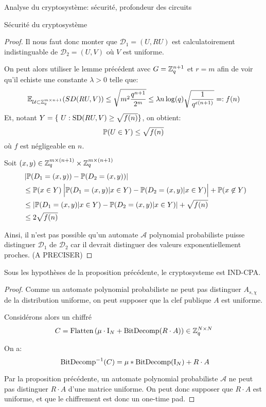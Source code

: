 \begin{section}{Analyse du cryptosystème: sécurité, profondeur des circuits}
\begin{subsection}{Sécurité du cryptosystème}
\begin{proof}
	Il nous faut donc monter que $\mathcal{D}_1 = (U, RU)$ est calculatoirement
	indistinguable de $\mathcal{D}_2 = (U, V)$ où $V$ est uniforme.
	
	On peut alors utiliser le lemme précédent avec $G = \mathbb{Z}_q^{n+1}$
	et $r = m$ afin de voir qu'il echiste une constante $\lambda > 0$
	telle que:
	\[\mathbb{E}_{\mathcal{U}\subset \mathbb{Z}_q^{m\times n+1}}(SD(RU,V)) \leq 
		\sqrt{m^2\frac{q^{n+1}}{2^m}}\leq \lambda
	n\log(q)\sqrt{\frac{1}{q^{\epsilon(n+1)}}}=: f(n) \]
	Et, notant $Y = \{ U: \SD(RU,V) \geq \sqrt{f(n)}\}$, on obtient:
	\[\mathbb{P}(U \in Y) \leq \sqrt{f(n)} \]
	où $f$ est négligeable en $n$. 



	
	Soit $(x,y)\in \mathbb{Z}_q^{m \times (n+1)} \times \mathbb{Z}_q^{m \times (n+1)}$
	\begin{align*}
	&\left|\PP(D_1 = (x,y)) - \PP(D_2 = (x,y))\right| \\ &\leq \PP(x\in Y)\:
	\Big|\PP(D_1 
	= (x,y)| x\in Y) - \PP(D_2 = (x,y)|x\in Y)\Big| + \PP(x \not\in Y)  \\
	&\leq |\PP(D_1 = (x,y) | x \in Y) - \PP(D_2 = (x,y)|x \in Y)| + \sqrt{f(n)} \\
	&\leq 2\sqrt{f(n)} 
	\end{align*}
	
	Ainsi, il n'est pas possible qu'un automate $\mathcal{A}$
	polynomial probabiliste puisse distinguer 
	$\mathcal{D}_1$ de $\mathcal{D}_2$ car il devrait distinguer
	des valeurs exponentiellement proches. (A PRECISER)
	\end{proof}

	\begin{thm}
	Sous les hypothèses de la proposition précédente, le
	cryptosysteme est IND-CPA.
	\end{thm}
	\begin{proof}
	Comme un automate polynomial probabiliste ne peut pas distinguer
	$A_{s, \chi}$ de la distribution uniforme, on peut supposer que la
	clef publique $A$ est uniforme.

	Considérons alors un chiffré 
	\[C = \text{Flatten}\left(\mu \cdot \text{I}_N + \text{BitDecomp}(R\cdot A)\right) \in
	\mathbb{Z}_q^{N\times N}\]

	On a:
	\[ \bitdecomp^{-1}(C) = \mu * \bitdecomp(\id_N) + R\cdot A\]

	Par la proposition précédente, un automate polynomial probabiliste $\mathcal{A}$
	ne peut pas distinguer $R\cdot A$ d'une matrice uniforme. On peut donc
	supposer que $R\cdot A$ est uniforme, et que le chiffrement est donc
	un one-time pad.


\end{proof}
\end{subsection}
\end{section}
